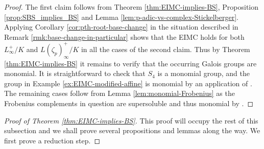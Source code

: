 \documentclass[12pt]{amsart}
\theoremstyle{plain}
\theoremstyle{remark}
\theoremstyle{definition}
\numberwithin{equation}{section}
\begin{document}
{\begin{proof}
The first claim follows from Theorem \ref{thm:EIMC-implies-BS}, Proposition \ref{prop:SBS_implies_BS} 
and Lemma \ref{lem:p-adic-vs-complex-Stickelberger}. 
Applying Corollary \ref{cor:pth-root-base-change} in the situation described in Remark \ref{rmk:base-change-in-particular}
shows that the EIMC holds for both $L^{+}_{\infty}/K$ and $L(\zeta_{p})^{+}_{\infty}/K$ in all the cases of the second claim.
Thus by Theorem \ref{thm:EIMC-implies-BS} it remains to verify that the occurring Galois groups are monomial. 
It is straightforward to check that $S_{4}$ is a monomial group, and the
group in Example \ref{ex:EIMC-modified-affine} is monomial by an application
of \cite[Chapter 2, Theorem 3.10]{MR655785}.
The remaining cases follow from Lemma \ref{lem:monomial-Frobenius}
as the Frobenius complements in question are supersoluble and thus monomial by \cite[Theorem 4.8 (1)]{MR1984740}. 
 \end{proof}

\begin{proof}[Proof of Theorem \ref{thm:EIMC-implies-BS}]
This proof will occupy the rest of this subsection and we shall prove several propositions and lemmas along the way.
We first prove a reduction step. 


\end{proof}}
\end{document}
